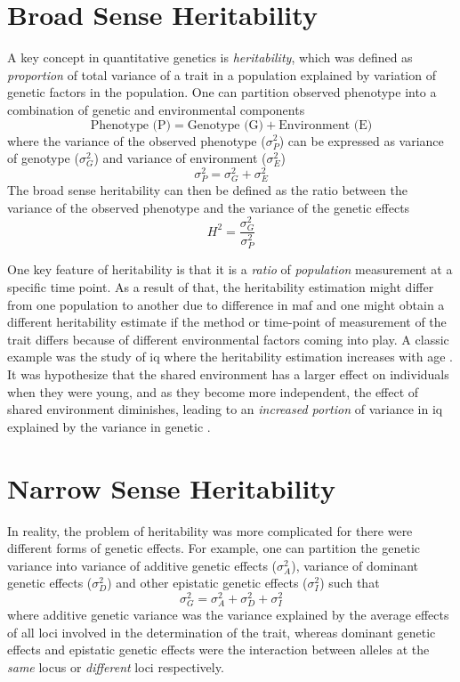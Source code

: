 
	\section{Broad Sense Heritability}

	A key concept in quantitative genetics is \emph{heritability}, which was defined as \emph{proportion} of total variance of a trait in a population explained by variation of genetic factors in the population.
	One can partition observed phenotype into a combination of genetic and environmental components \citep{Falconer1996}
	$$
	\text{Phenotype (P)}=\text{Genotype (G)}+\text{Environment (E)}
	$$
	where the variance of the observed phenotype ($\sigma_P^2$) can be expressed as variance of genotype ($\sigma_G^2$) and variance of environment ($\sigma_E^2$)
	$$
		\sigma_P^2=\sigma_G^2+\sigma_E^2
	$$
	The broad sense heritability can then be defined as the ratio between the variance of the observed phenotype and the variance of the genetic effects
	$$
	H^2=\frac{\sigma_G^2}{\sigma_P^2}
	$$
	
	One key feature of heritability is that it is a \emph{ratio} of \emph{population} measurement at a specific time point.
	As a result of that, the heritability estimation might differ from one population to another due to difference in \gls{maf} and one might obtain a different heritability estimate if the method or time-point of measurement of the trait differs because of different environmental factors coming into play.
	A classic example was the study of \gls{iq} where the heritability estimation increases with age \citep{Bouchard2013}.
	It was hypothesize that the shared environment has a larger effect on individuals when they were young, and as they become more independent, the effect of shared environment diminishes, leading to an \emph{increased portion} of variance in \gls{iq} explained by the variance in genetic \citep{Bouchard2013}. 
	
	\section{Narrow Sense Heritability}
	In reality, the problem of heritability was more complicated for there were different forms of genetic effects. 
	For example, one can partition the genetic variance into variance of additive genetic effects ($\sigma_A^2$), variance of dominant genetic effects ($\sigma_D^2$) and other epistatic genetic effects ($\sigma_I^2$) such that
	$$
		\sigma_G^2=\sigma_A^2+\sigma_D^2+\sigma_I^2
	$$
	where additive genetic variance was the variance explained by the average effects of all loci involved in the determination of the trait, whereas dominant genetic effects and epistatic genetic effects were the interaction between alleles at the \emph{same} locus or \emph{different} loci respectively.
	
